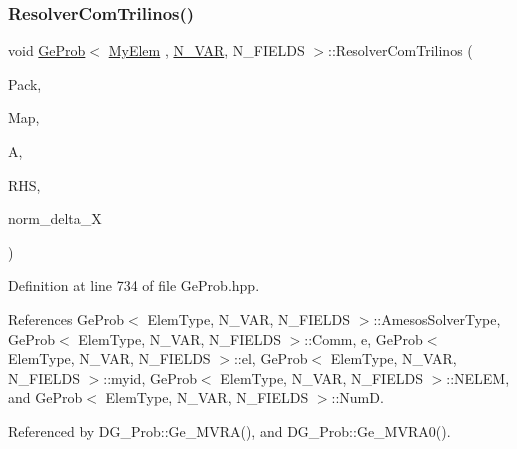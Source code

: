 \subsubsection{\texorpdfstring{Resolver\+Com\+Trilinos()}{ResolverComTrilinos()}}
{\footnotesize\ttfamily void \hyperlink{classGeProb}{Ge\+Prob}$<$ \hyperlink{DG__Prob_8h_a83cd887ced9a6587428f267e50cd4787}{My\+Elem} , \hyperlink{classED__Prob_a4e7d2ff1a8e435e336fb00c527224b5a}{N\+\_\+\+V\+AR}, N\+\_\+\+F\+I\+E\+L\+DS $>$\+::Resolver\+Com\+Trilinos (\begin{DoxyParamCaption}\item[{const std\+::string}]{Pack,  }\item[{Epetra\+\_\+\+Map}]{Map,  }\item[{Teuchos\+::\+R\+CP$<$ Epetra\+\_\+\+F\+E\+Crs\+Matrix $>$}]{A,  }\item[{Teuchos\+::\+R\+CP$<$ Epetra\+\_\+\+F\+E\+Vector $>$}]{R\+HS,  }\item[{double\+\_\+t \&}]{norm\+\_\+delta\+\_\+X }\end{DoxyParamCaption})\hspace{0.3cm}{\ttfamily [inherited]}}



Definition at line 734 of file Ge\+Prob.\+hpp.



References Ge\+Prob$<$ Elem\+Type, N\+\_\+\+V\+A\+R, N\+\_\+\+F\+I\+E\+L\+D\+S $>$\+::\+Amesos\+Solver\+Type, Ge\+Prob$<$ Elem\+Type, N\+\_\+\+V\+A\+R, N\+\_\+\+F\+I\+E\+L\+D\+S $>$\+::\+Comm, e, Ge\+Prob$<$ Elem\+Type, N\+\_\+\+V\+A\+R, N\+\_\+\+F\+I\+E\+L\+D\+S $>$\+::el, Ge\+Prob$<$ Elem\+Type, N\+\_\+\+V\+A\+R, N\+\_\+\+F\+I\+E\+L\+D\+S $>$\+::myid, Ge\+Prob$<$ Elem\+Type, N\+\_\+\+V\+A\+R, N\+\_\+\+F\+I\+E\+L\+D\+S $>$\+::\+N\+E\+L\+EM, and Ge\+Prob$<$ Elem\+Type, N\+\_\+\+V\+A\+R, N\+\_\+\+F\+I\+E\+L\+D\+S $>$\+::\+NumD.



Referenced by D\+G\+\_\+\+Prob\+::\+Ge\+\_\+\+M\+V\+R\+A(), and D\+G\+\_\+\+Prob\+::\+Ge\+\_\+\+M\+V\+R\+A0().

\mbox{\label{classGeProb_adc17f3e57dab093882ec7f7aebea634f}} 
